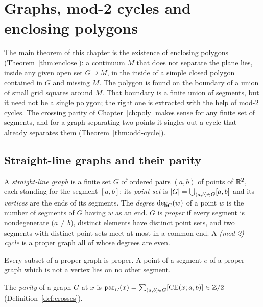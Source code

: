 \chapter{Graphs, mod-2 cycles and enclosing polygons}\label{ch:enc}

The main theorem of this chapter is the existence of enclosing polygons
(Theorem~\ref{thm:enclose}): a continuum $M$ that does not separate the plane lies, inside any
given open set $G\supseteq M$, in the inside of a simple closed polygon contained in $G$ and
missing $M$. The polygon is found on the boundary of a union of small grid squares around $M$.
That boundary is a finite union of segments, but it need not be a single polygon; the right one
is extracted with the help of mod-2 cycles. The crossing parity of Chapter~\ref{ch:poly} makes sense
for any finite set of segments, and for a graph separating two points it singles out a cycle that
already separates them (Theorem~\ref{thm:odd-cycle}).

\section{Straight-line graphs and their parity}

\begin{definition}\label{def:graph}
A \emph{straight-line graph} is a finite set $G$ of ordered pairs $(a,b)$ of points of $\mathbb{R}^2$, each
standing for the segment $[a,b]$; its \emph{point set} is $\lvert G\rvert=\bigcup_{(a,b)\in G}[a,b]$ and its
\emph{vertices} are the ends of its segments. The \emph{degree} $\operatorname{deg}_G(w)$ of a point $w$ is the
number of segments of $G$ having $w$ as an end. $G$ is \emph{proper} if every segment is
nondegenerate ($a\neq b$), distinct elements have distinct point sets, and two segments with
distinct point sets meet at most in a common end. A \emph{(mod-2) cycle} is a proper graph all of
whose degrees are even.
\end{definition}


Every subset of a proper graph is proper. A point of a segment $e$ of a proper graph which is not
a vertex lies on no other segment.

\begin{definition}
The \emph{parity} of a graph $G$ at $x$ is
$\operatorname{par}_G(x)=\sum_{(a,b)\in G}[\mathrm{CE}(x;a,b)]\in\mathbb{Z}/2$ (Definition~\ref{def:crosses}).
\end{definition}


